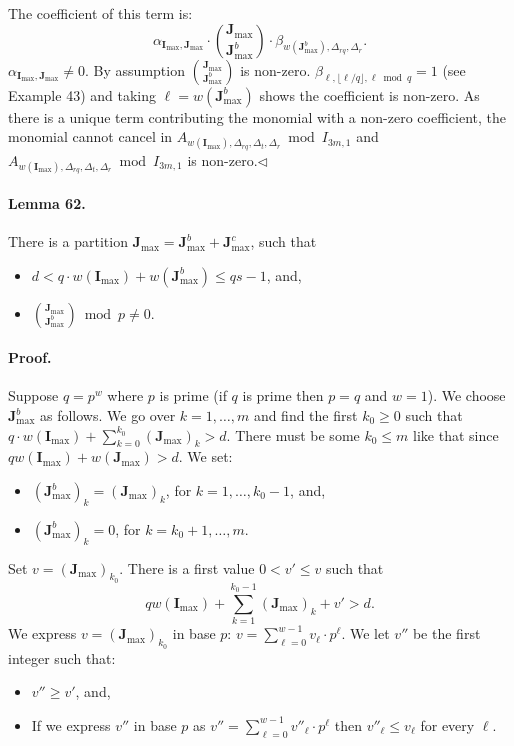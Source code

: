 \documentclass[10pt,a4paper]{article}
\begin{document}
The coefficient of this term is:
\[\alpha_{\boldsymbol I_{\max},\boldsymbol J_{\max}}\cdot\binom{\boldsymbol J_{\max}}{\boldsymbol J_{\max}^b}\cdot\beta_{w(\boldsymbol J_{\max}^b),\Delta_{rq},\Delta_r}.\]
$\alpha_{\boldsymbol I_{\max},\boldsymbol J_{\max}}\neq0$. By assumption $\binom{\boldsymbol J_{\max}}{\boldsymbol J_{\max}^b}$ is non-zero. $\beta_{\ell,\lfloor\ell/q\rfloor,\ell\bmod q}=1$ (see Example 43) and taking $\ell=w(\boldsymbol J_{\max}^b)$ shows the coefficient is non-zero. As there is a unique term contributing the monomial with a non-zero coefficient, the monomial cannot cancel in $A_{w(\boldsymbol I_{\max}),\Delta_{rq},\Delta_t,\Delta_r}\bmod I_{3m,1}$ and $A_{w(\boldsymbol I_{\max}),\Delta_{rq},\Delta_t,\Delta_r}\bmod I_{3m,1}$ is non-zero.\hfill$\triangleleft$
\paragraph{Lemma 62.} There is a partition $\boldsymbol J_{\max}=\boldsymbol J_{\max}^b+\boldsymbol J_{\max}^c$, such that
\begin{itemize}
\item $d<q\cdot w(\boldsymbol I_{\max})+w(\boldsymbol J_{\max}^b)\leq qs-1$, and,
\item $\binom{\boldsymbol J_{\max}}{\boldsymbol J_{\max}^b}\bmod p\neq0$.
\end{itemize}
\paragraph{Proof.} Suppose $q=p^w$ where $p$ is prime (if $q$ is prime then $p=q$ and $w=1$). We choose $\boldsymbol J_{\max}^b$ as follows. We go over $k=1,\ldots,m$ and find the first $k_0\geq0$ such that $q\cdot w(\boldsymbol I_{\max})+\sum_{k=0}^{k_0}(\boldsymbol J_{\max})_k>d$. There must be some $k_0\leq m$ like that since $qw(\boldsymbol I_{\max})+w(\boldsymbol J_{\max})>d$. We set:
\begin{itemize}
\item $(\boldsymbol J_{\max}^b)_k=(\boldsymbol J_{\max})_k$, for $k=1,\ldots,k_0-1$, and,
\item $(\boldsymbol J_{\max}^b)_k=0$, for $k=k_0+1,\ldots,m$.
\end{itemize}
Set $v=(\boldsymbol J_{\max})_{k_0}$. There is a first value $0<v'\leq v$ such that
\[qw(\boldsymbol I_{\max})+\sum_{k=1}^{k_0-1}(\boldsymbol J_{\max})_k+v'>d.\]
We express $v=(\boldsymbol J_{\max})_{k_0}$ in base $p$: $v=\sum_{\ell=0}^{w-1}v_\ell\cdot p^\ell$. We let $v''$ be the first integer such that:
\begin{itemize}
\item $v''\geq v'$, and,
\item If we express $v''$ in base $p$ as $v''=\sum_{\ell=0}^{w-1}v''_\ell\cdot p^\ell$ then $v''_\ell\leq v_\ell$ for every $\ell$.
\end{itemize}
\end{document}
